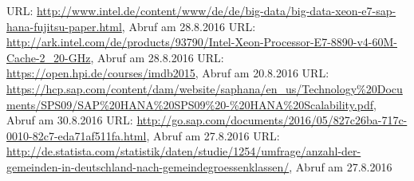 \begin{thebibliography}{}
	 URL: \url{http://www.intel.de/content/www/de/de/big-data/big-data-xeon-e7-sap-hana-fujitsu-paper.html}, Abruf am 28.8.2016
	 URL: \url{http://ark.intel.com/de/products/93790/Intel-Xeon-Processor-E7-8890-v4-60M-Cache-2_20-GHz}, Abruf am 28.8.2016
	 URL: \url{https://open.hpi.de/courses/imdb2015}, Abruf am 20.8.2016
	 URL: \url{https://hcp.sap.com/content/dam/website/saphana/en_us/Technology%20Documents/SPS09/SAP%20HANA%20SPS09%20-%20HANA%20Scalability.pdf}, Abruf am 30.8.2016
	 URL: \url{http://go.sap.com/documents/2016/05/827c26ba-717c-0010-82c7-eda71af511fa.html}, Abruf am 27.8.2016
	 URL: \url{http://de.statista.com/statistik/daten/studie/1254/umfrage/anzahl-der-gemeinden-in-deutschland-nach-gemeindegroessenklassen/}, Abruf am 27.8.2016
	 
  \end{thebibliography}
